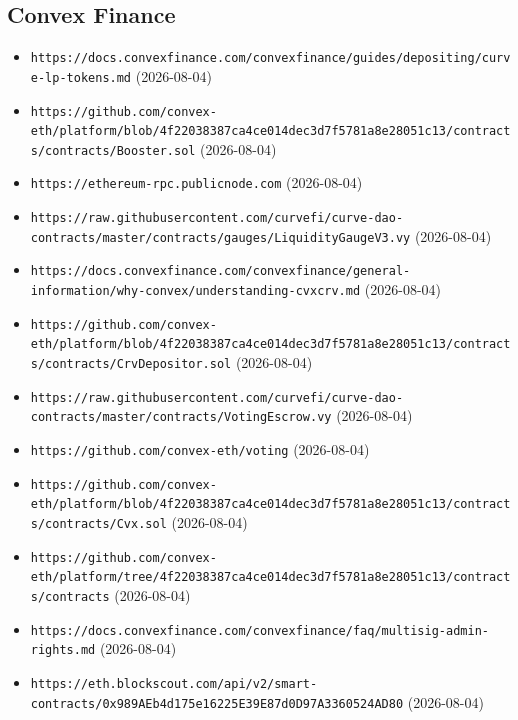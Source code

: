 \subsection*{Convex Finance}
\begin{itemize}\setlength{\itemsep}{0pt}\small
\item \texttt{https://docs.convexfinance.com/convexfinance/guides/depositing/curve-lp-tokens.md} (2026-08-04)
\item \texttt{https://github.com/convex-eth/platform/blob/4f22038387ca4ce014dec3d7f5781a8e28051c13/contracts/contracts/Booster.sol} (2026-08-04)
\item \texttt{https://ethereum-rpc.publicnode.com} (2026-08-04)
\item \texttt{https://raw.githubusercontent.com/curvefi/curve-dao-contracts/master/contracts/gauges/LiquidityGaugeV3.vy} (2026-08-04)
\item \texttt{https://docs.convexfinance.com/convexfinance/general-information/why-convex/understanding-cvxcrv.md} (2026-08-04)
\item \texttt{https://github.com/convex-eth/platform/blob/4f22038387ca4ce014dec3d7f5781a8e28051c13/contracts/contracts/CrvDepositor.sol} (2026-08-04)
\item \texttt{https://raw.githubusercontent.com/curvefi/curve-dao-contracts/master/contracts/VotingEscrow.vy} (2026-08-04)
\item \texttt{https://github.com/convex-eth/voting} (2026-08-04)
\item \texttt{https://github.com/convex-eth/platform/blob/4f22038387ca4ce014dec3d7f5781a8e28051c13/contracts/contracts/Cvx.sol} (2026-08-04)
\item \texttt{https://github.com/convex-eth/platform/tree/4f22038387ca4ce014dec3d7f5781a8e28051c13/contracts/contracts} (2026-08-04)
\item \texttt{https://docs.convexfinance.com/convexfinance/faq/multisig-admin-rights.md} (2026-08-04)
\item \texttt{https://eth.blockscout.com/api/v2/smart-contracts/0x989AEb4d175e16225E39E87d0D97A3360524AD80} (2026-08-04)
\end{itemize}

